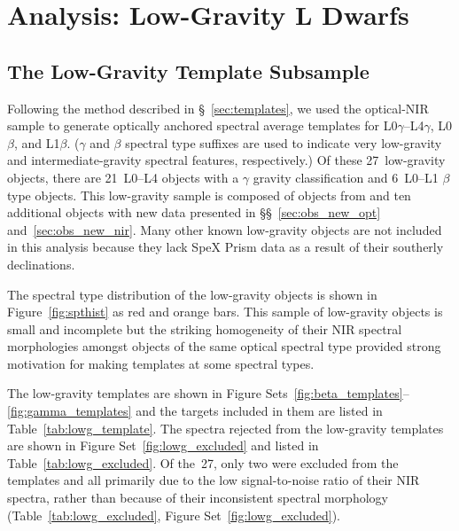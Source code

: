 \documentclass[12pt]{aastex6}
\newcommand{\sample}{170}
\newcommand{\optLowG}{27}
\newcommand{\optBeta}{6}
\newcommand{\optGamma}{21}
\begin{document}
\section{Analysis: Low-Gravity L Dwarfs}
\label{sec:lowg}

\subsection{The Low-Gravity Template Subsample}
\label{sec:templates_lowg}

Following the method described in \S~\ref{sec:templates}, we used the optical-NIR sample to generate optically anchored spectral average templates for L0$\gamma$--L4$\gamma$, L0$\beta$, and L1$\beta$.
($\gamma$ and $\beta$ spectral type suffixes are used to indicate very low-gravity and intermediate-gravity spectral features, respectively.)
Of these \optLowG~low-gravity objects, there are \optGamma~L0--L4 objects with a $\gamma$ gravity classification and \optBeta~L0--L1 $\beta$ type objects.
This low-gravity sample is composed of objects from \citet{Cruz07,Kirkpatrick08,Cruz09_lowg} and ten additional objects with new data presented in \S\S~\ref{sec:obs_new_opt} and~\ref{sec:obs_new_nir}.
Many other known low-gravity objects are not included in this analysis because they lack SpeX Prism data as a result of their southerly declinations.

The spectral type distribution of the low-gravity objects is shown in Figure~\ref{fig:spthist} as red and orange bars.
This sample of low-gravity objects is small and incomplete but the striking homogeneity of their NIR spectral morphologies amongst objects of the same optical spectral type provided strong motivation for making templates at some spectral types.

The low-gravity templates are shown in Figure Sets~\ref{fig:beta_templates}--\ref{fig:gamma_templates} and the targets included in them are listed in Table~\ref{tab:lowg_template}.
The spectra rejected from the low-gravity templates are shown in Figure Set~\ref{fig:lowg_excluded} and listed in Table~\ref{tab:lowg_excluded}.
Of the~\optLowG, only two were excluded from the templates and all primarily due to the low signal-to-noise ratio of their NIR spectra, rather than because of their inconsistent spectral morphology (Table~\ref{tab:lowg_excluded}, Figure Set~\ref{fig:lowg_excluded}).
\end{document}
